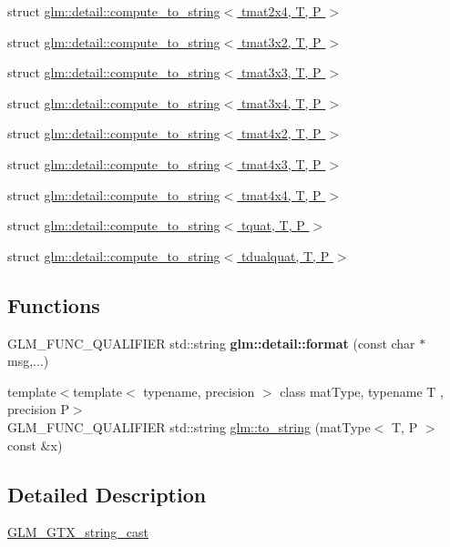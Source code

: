\begin{DoxyCompactItemize}
struct \hyperlink{structglm_1_1detail_1_1compute__to__string_3_01tmat2x4_00_01T_00_01P_01_4}{glm\+::detail\+::compute\+\_\+to\+\_\+string$<$ tmat2x4, T, P $>$}
\item 
struct \hyperlink{structglm_1_1detail_1_1compute__to__string_3_01tmat3x2_00_01T_00_01P_01_4}{glm\+::detail\+::compute\+\_\+to\+\_\+string$<$ tmat3x2, T, P $>$}
\item 
struct \hyperlink{structglm_1_1detail_1_1compute__to__string_3_01tmat3x3_00_01T_00_01P_01_4}{glm\+::detail\+::compute\+\_\+to\+\_\+string$<$ tmat3x3, T, P $>$}
\item 
struct \hyperlink{structglm_1_1detail_1_1compute__to__string_3_01tmat3x4_00_01T_00_01P_01_4}{glm\+::detail\+::compute\+\_\+to\+\_\+string$<$ tmat3x4, T, P $>$}
\item 
struct \hyperlink{structglm_1_1detail_1_1compute__to__string_3_01tmat4x2_00_01T_00_01P_01_4}{glm\+::detail\+::compute\+\_\+to\+\_\+string$<$ tmat4x2, T, P $>$}
\item 
struct \hyperlink{structglm_1_1detail_1_1compute__to__string_3_01tmat4x3_00_01T_00_01P_01_4}{glm\+::detail\+::compute\+\_\+to\+\_\+string$<$ tmat4x3, T, P $>$}
\item 
struct \hyperlink{structglm_1_1detail_1_1compute__to__string_3_01tmat4x4_00_01T_00_01P_01_4}{glm\+::detail\+::compute\+\_\+to\+\_\+string$<$ tmat4x4, T, P $>$}
\item 
struct \hyperlink{structglm_1_1detail_1_1compute__to__string_3_01tquat_00_01T_00_01P_01_4}{glm\+::detail\+::compute\+\_\+to\+\_\+string$<$ tquat, T, P $>$}
\item 
struct \hyperlink{structglm_1_1detail_1_1compute__to__string_3_01tdualquat_00_01T_00_01P_01_4}{glm\+::detail\+::compute\+\_\+to\+\_\+string$<$ tdualquat, T, P $>$}
\end{DoxyCompactItemize}
\subsection*{Functions}
\begin{DoxyCompactItemize}
\item 
\mbox{\label{string__cast_8inl_acd5305bbd1c5417b1eb770faf8229d14}} 
G\+L\+M\+\_\+\+F\+U\+N\+C\+\_\+\+Q\+U\+A\+L\+I\+F\+I\+ER std\+::string {\bfseries glm\+::detail\+::format} (const char $\ast$msg,...)
\item 
{\footnotesize template$<$template$<$ typename, precision $>$ class mat\+Type, typename T , precision P$>$ }\\G\+L\+M\+\_\+\+F\+U\+N\+C\+\_\+\+Q\+U\+A\+L\+I\+F\+I\+ER std\+::string \hyperlink{group__gtx__string__cast_ga7b4f9233593bbf1d53762f801ef56fe6}{glm\+::to\+\_\+string} (mat\+Type$<$ T, P $>$ const \&x)
\end{DoxyCompactItemize}


\subsection{Detailed Description}
\hyperlink{group__gtx__string__cast}{G\+L\+M\+\_\+\+G\+T\+X\+\_\+string\+\_\+cast} 
